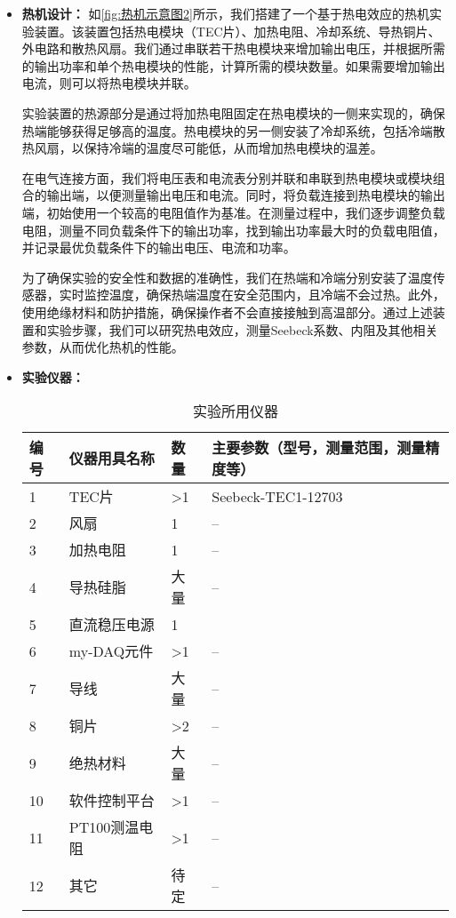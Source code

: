\documentclass[dvipsnames, svgnames,a4paper,11pt]{article}
\begin{document}
    \begin{itemize}
        \item \textbf{热机设计：}
            如\cref{fig:热机示意图2}所示，我们搭建了一个基于热电效应的热机实验装置。该装置包括热电模块（TEC片）、加热电阻、冷却系统、导热铜片、外电路和散热风扇。我们通过串联若干热电模块来增加输出电压，并根据所需的输出功率和单个热电模块的性能，计算所需的模块数量。如果需要增加输出电流，则可以将热电模块并联。

            实验装置的热源部分是通过将加热电阻固定在热电模块的一侧来实现的，确保热端能够获得足够高的温度。热电模块的另一侧安装了冷却系统，包括冷端散热风扇，以保持冷端的温度尽可能低，从而增加热电模块的温差。

            在电气连接方面，我们将电压表和电流表分别并联和串联到热电模块或模块组合的输出端，以便测量输出电压和电流。同时，将负载连接到热电模块的输出端，初始使用一个较高的电阻值作为基准。在测量过程中，我们逐步调整负载电阻，测量不同负载条件下的输出功率，找到输出功率最大时的负载电阻值，并记录最优负载条件下的输出电压、电流和功率。

            为了确保实验的安全性和数据的准确性，我们在热端和冷端分别安装了温度传感器，实时监控温度，确保热端温度在安全范围内，且冷端不会过热。此外，使用绝缘材料和防护措施，确保操作者不会直接接触到高温部分。通过上述装置和实验步骤，我们可以研究热电效应，测量Seebeck系数、内阻及其他相关参数，从而优化热机的性能。

        \clearpage
        \item \textbf{实验仪器：}
        \begin{table}[htbp]
            \centering
            \renewcommand\arraystretch{1.6}
            \begin{tabular}{p{}|p{}|p{}|p{}}
                \hline
                编号& 仪器用具名称 & 数量 &  主要参数（型号，测量范围，测量精度等） \\
                \hline
                1& TEC片 & >1 & Seebeck-TEC1-12703 \\
                2& 风扇 & 1 & -- \\
                3& 加热电阻 & 1 & -- \\
                4& 导热硅脂 & 大量 & -- \\
                5& 直流稳压电源 & 1 &  \\
                6& my-DAQ元件 & >1 & -- \\
                7& 导线 & 大量 & -- \\
                8& 铜片 & >2 & -- \\
                9& 绝热材料 & 大量 & -- \\
                10& 软件控制平台 & >1 & -- \\
                11& PT100测温电阻 & >1 & -- \\
                12& 其它 & 待定 & -- \\
                \hline
            \end{tabular}
            \caption{实验所用仪器}
        \end{table}
        
    \end{itemize}
\end{document}
